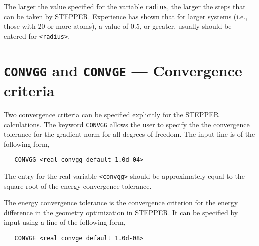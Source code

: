 The larger the value specified for the variable \verb+radius+, the
larger the steps that can be taken by STEPPER.  Experience has shown
that for larger systems (i.e., those with 20 or more atoms), a value
of 0.5, or greater, usually should be entered for \verb+<radius>+.

\section{{\tt CONVGG} and {\tt CONVGE} --- Convergence criteria}

Two convergence criteria can be specified explicitly for the 
STEPPER calculations.  The keyword \verb+CONVGG+ allows the user to
specify the the convergence tolerance for the gradient norm for
all degrees of freedom.  The input line is of the following form,
\begin{verbatim}
   CONVGG <real convgg default 1.0d-04>
\end{verbatim}
The entry for the real variable \verb+<convgg>+ should be approximately 
equal to the square root of the energy convergence tolerance.

The energy convergence tolerance is the convergence criterion for the 
energy difference in the geometry optimization in STEPPER.  It can be
specified by input using a line of the following form,
\begin{verbatim}
   CONVGE <real convge default 1.0d-08>
\end{verbatim}


